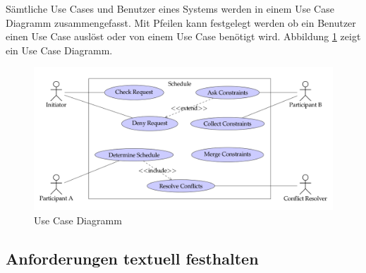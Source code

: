 Sämtliche Use Cases und Benutzer eines Systems werden in einem Use Case Diagramm zusammengefasst. Mit Pfeilen kann festgelegt werden ob ein Benutzer einen Use Case auslöst oder von einem Use Case benötigt wird. Abbildung \ref{fig:use-case-diagramm} zeigt ein Use Case Diagramm.
\begin{figure}
\centering
\includegraphics[width=\linewidth]{fig/use-case-diagramm}
\caption{Use Case Diagramm}
\label{fig:use-case-diagramm}
\end{figure}

\subsection{Anforderungen textuell festhalten}

